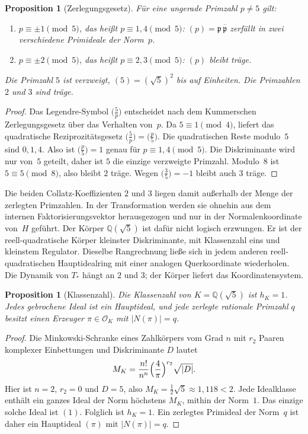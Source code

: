 \documentclass[11pt,a4paper]{article}
\theoremstyle{plain}
\newtheorem{proposition}[theorem]{Proposition}
\theoremstyle{definition}
\newcommand{\Q}{\mathbb{Q}}
\newcommand{\OK}{\mathcal{O}_K}
\numberwithin{equation}{section}
\begin{document}
\begin{proposition}[Zerlegungsgesetz]
Für eine ungerade Primzahl $p\neq 5$ gilt:
\begin{enumerate}
\item $p\equiv \pm 1\pmod{5}$, das heißt $p\equiv 1,4\pmod{5}$:
$(p)=\mathfrak{p}\,\overline{\mathfrak{p}}$ zerfällt in zwei verschiedene Primideale der Norm~$p$.
\item $p\equiv \pm 2\pmod{5}$, das heißt $p\equiv 2,3\pmod{5}$:
$(p)$ bleibt träge.
\end{enumerate}
Die Primzahl $5$ ist verzweigt, $(5)=(\sqrt{5})^2$ bis auf Einheiten.
Die Primzahlen $2$ und $3$ sind träge.
\end{proposition}

\begin{proof}
Das Legendre-Symbol $\bigl(\frac{5}{p}\bigr)$ entscheidet nach dem
Kummerschen Zerlegungsgesetz über das Verhalten von~$p$.
Da $5\equiv 1\pmod{4}$, liefert das quadratische Reziprozitätsgesetz
$\bigl(\frac{5}{p}\bigr)=\bigl(\frac{p}{5}\bigr)$.
Die quadratischen Reste modulo~$5$ sind $0,1,4$.
Also ist $\bigl(\frac{p}{5}\bigr)=1$ genau für $p\equiv 1,4\pmod{5}$.
Die Diskriminante wird nur von~$5$ geteilt, daher ist $5$ die einzige
verzweigte Primzahl.
Modulo~$8$ ist $5\equiv 5\pmod{8}$, also bleibt $2$ träge.
Wegen $\bigl(\frac{3}{5}\bigr)=-1$ bleibt auch $3$ träge.
\end{proof}

Die beiden Collatz-Koeffizienten $2$ und $3$ liegen damit außerhalb der
Menge der zerlegten Primzahlen.
In der Transformation werden sie ohnehin aus dem internen Faktorisierungsvektor
herausgezogen und nur in der Normalenkoordinate von~$H$ geführt.
Der Körper $\Q(\sqrt{5})$ ist dafür nicht logisch erzwungen.
Er ist der reell-quadratische Körper kleinster Diskriminante, mit
Klassenzahl eins und kleinstem Regulator.
Dieselbe Rangrechnung ließe sich in jedem anderen reell-quadratischen
Hauptidealring mit einer analogen Querkoordinate wiederholen.
Die Dynamik von $T_*$ hängt an $2$ und $3$; der Körper liefert das
Koordinatensystem.

\begin{proposition}[Klassenzahl]
Die Klassenzahl von $K=\Q(\sqrt{5})$ ist $h_K=1$.
Jedes gebrochene Ideal ist ein Hauptideal, und jede zerlegte rationale
Primzahl $q$ besitzt einen Erzeuger $\pi\in\OK$ mit $\lvert N(\pi)\rvert=q$.
\end{proposition}

\begin{proof}
Die Minkowski-Schranke eines Zahlkörpers vom Grad $n$ mit $r_2$ Paaren
komplexer Einbettungen und Diskriminante $D$ lautet
\begin{equation}
M_K=\frac{n!}{n^n}\Bigl(\frac{4}{\pi}\Bigr)^{r_2}\sqrt{\lvert D\rvert}.
\end{equation}
Hier ist $n=2$, $r_2=0$ und $D=5$, also
$M_K=\frac12\sqrt{5}\approx 1{,}118<2$.
Jede Idealklasse enthält ein ganzes Ideal der Norm höchstens $M_K$,
mithin der Norm~$1$.
Das einzige solche Ideal ist $(1)$.
Folglich ist $h_K=1$.
Ein zerlegtes Primideal der Norm~$q$ ist daher ein Hauptideal $(\pi)$ mit
$\lvert N(\pi)\rvert=q$.
\end{proof}
\end{document}
